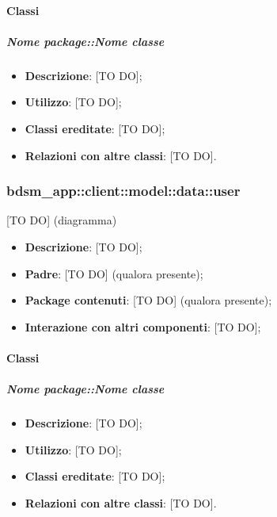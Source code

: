		\paragraph{Classi} %
			\subparagraph{Nome package::Nome classe} %
			\label{subp:subparagraph_name}
				\begin{itemize}
					\item \textbf{Descrizione}: [TO DO];
					\item \textbf{Utilizzo}: [TO DO];
					\item \textbf{Classi ereditate}: [TO DO];
					\item \textbf{Relazioni con altre classi}: [TO DO].
				\end{itemize}	

	\subsubsection{bdsm\_app::client::model::data::user} %
	\label{ssub:bdsm_app_client_model_data_user}
	[TO DO] (diagramma) \newline \newline

	\begin{itemize}
		\item \textbf{Descrizione}: [TO DO];
		\item \textbf{Padre}: [TO DO] (qualora presente);
		\item \textbf{Package contenuti}: [TO DO] (qualora presente);
		\item \textbf{Interazione con altri componenti}: [TO DO];
	\end{itemize}

		\paragraph{Classi} %
			\subparagraph{Nome package::Nome classe} %
			\label{subp:subparagraph_name}
				\begin{itemize}
					\item \textbf{Descrizione}: [TO DO];
					\item \textbf{Utilizzo}: [TO DO];
					\item \textbf{Classi ereditate}: [TO DO];
					\item \textbf{Relazioni con altre classi}: [TO DO].
				\end{itemize}	

